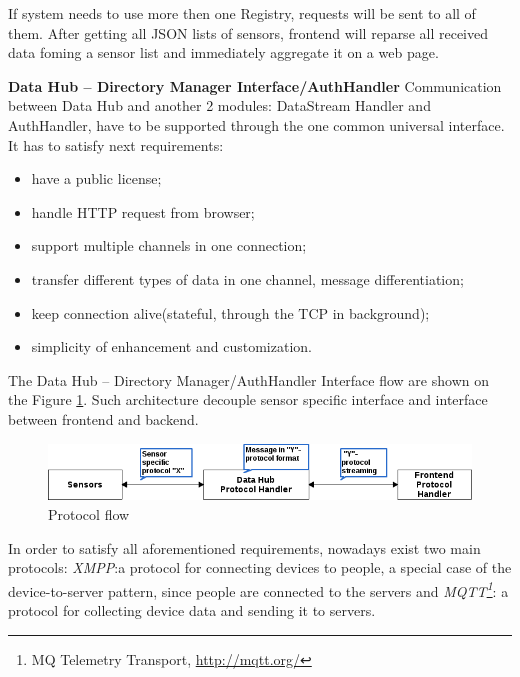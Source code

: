       If system needs to use more then one Registry, requests will be sent to all of them. After getting all JSON lists of sensors, frontend will reparse all received data foming a sensor list and immediately aggregate it on a web page.

      \textbf{Data Hub -- Directory Manager Interface/AuthHandler}
      \newline
      Communication between Data Hub and another 2 modules: DataStream Handler and AuthHandler, have to be supported through the one common universal interface. It has to satisfy next requirements:
      \begin{itemize}
      \item have a public license;
      \item handle HTTP request from browser;
      \item support multiple channels in one connection;
      \item transfer different types of data in one channel, message differentiation;
      \item keep connection alive(stateful, through the TCP in background);
      \item simplicity of enhancement and customization.
      \end{itemize}

      The Data Hub -- Directory Manager/AuthHandler Interface flow are shown on the Figure \ref{img:protocol}. Such architecture decouple sensor specific interface and interface between frontend and backend.

      \begin{figure}[!ht]
      \centering
      \includegraphics[scale=0.6]{images/Protocol_flow.png}   
      \caption[Protocol flow]{Protocol flow}
      \label{img:protocol}                           
      \end{figure}

      In order to satisfy all aforementioned requirements, nowadays exist two main protocols: \emph{XMPP\cite{XMPPbook}}:a protocol for connecting devices to people, a special case of the device-to-server pattern, since people are connected to the servers and \emph{MQTT\footnote{MQ Telemetry Transport, \url{http://mqtt.org/}}}: a protocol for collecting device data and sending it to servers. 

